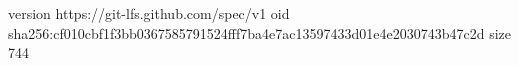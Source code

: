 version https://git-lfs.github.com/spec/v1
oid sha256:cf010cbf1f3bb0367585791524fff7ba4e7ac13597433d01e4e2030743b47c2d
size 744
